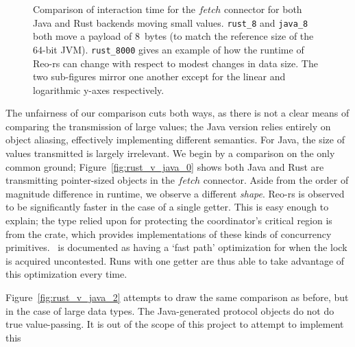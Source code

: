 \begin{figure}
{\begin{subfigure}[b]{0.63\textwidth}
			\caption{}
			\label{fig:rust_v_java_1}
		\end{subfigure}%
	}
	\caption[Java vs.\ Rust interaction time for small values.]{Comparison of interaction time for the $fetch$ connector for both Java and Rust backends moving small values. \texttt{rust\_8} and \texttt{java\_8}  both move a payload of 8~bytes (to match the reference size of the 64-bit JVM). \texttt{rust\_8000}  gives an example of how the runtime of Reo-rs can change with respect to modest changes in data size. The two sub-figures mirror one another except for the linear and logarithmic y-axes respectively.}
	\label{fig:rust_v_java}
\end{figure}

The unfairness of our comparison cuts both ways, as there is not a clear means of comparing the transmission of large values; the Java version relies entirely on object aliasing, effectively implementing different semantics. For Java, the size of values transmitted is largely irrelevant. We begin by a comparison on the only common ground; Figure~\ref{fig:rust_v_java_0} shows both Java and Rust are transmitting pointer-sized objects in the $fetch$ connector. Aside from the order of magnitude difference in runtime, we observe a different \textit{shape}. Reo-rs is observed to be significantly faster in the case of a single getter. This is easy enough to explain; the type relied upon for protecting the coordinator's critical region is  from the  crate, which provides implementations of these kinds of concurrency primitives. ~is documented as having a `fast path' optimization for when the lock is acquired uncontested. Runs with one getter are thus able to take advantage of this optimization every time.

Figure~\ref{fig:rust_v_java_2} attempts to draw the same comparison as before, but in the case of large data types. The Java-generated protocol objects do not do true value-passing. It is out of the scope of this project to attempt to implement this

